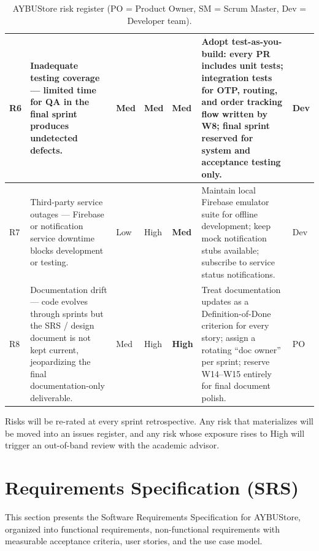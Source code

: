 \documentclass[11pt,a4paper]{article}
\begin{document}
\begin{table}[H]
\begin{tabular}{|p{}|p{}|p{}|p{}|p{}|p{}|p{}|}
R6 & Inadequate testing coverage --- limited time for QA in the final
sprint produces undetected defects. & Med & Med &
\cellcolor{riskMed}\textbf{Med} & Adopt test-as-you-build: every PR
includes unit tests; integration tests for OTP, routing, and order
tracking flow written by W8; final sprint reserved for system and
acceptance testing only. & Dev \\ \hline
 
R7 & Third-party service outages --- Firebase or notification service
downtime blocks development or testing. & Low & High &
\cellcolor{riskMed}\textbf{Med} & Maintain local Firebase emulator
suite for offline development; keep mock notification stubs available;
subscribe to service status notifications. & Dev \\ \hline
 
R8 & Documentation drift --- code evolves through sprints but the SRS
/ design document is not kept current, jeopardizing the final
documentation-only deliverable. & Med & High &
\cellcolor{riskHigh}\textbf{High} & Treat documentation updates as a
Definition-of-Done criterion for every story; assign a rotating
``doc owner'' per sprint; reserve W14--W15 entirely for final document
polish. & PO \\ \hline
\end{tabular}
\caption{AYBUStore risk register
(PO = Product Owner, SM = Scrum Master, Dev = Developer team).}
\label{tab:risks}
\end{table}
 
\noindent
Risks will be re-rated at every sprint retrospective. Any risk that
materializes will be moved into an issues register, and any risk
whose exposure rises to High will trigger an out-of-band review with
the academic advisor.
 
\section{Requirements Specification (SRS)}
\label{sec:srs}
This section presents the Software Requirements Specification for AYBUStore, organized into functional requirements, non-functional requirements with measurable acceptance criteria, user stories, and the use case model.
 
\end{document}
